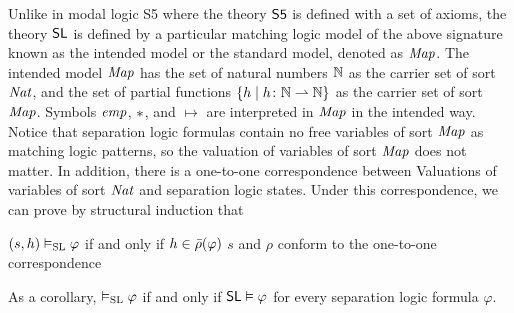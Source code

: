 \documentclass{amsart}
\begin{document}
Unlike in modal logic S5 where the theory $\MLSfive$ is defined with a set of
axioms,
the theory $\MLSL$ is defined by 
a particular matching logic model 
of the above signature
known as the intended model or the standard model, denoted as $\Map$.
The intended model $\Map$ has the set of natural numbers $\nats$ as the carrier
set of sort $\Nat$,
and the set of partial functions 
$ \{ h \mid h \colon \nats \pto \nats \} $
as the carrier set of sort $\Map$.
Symbols $\emp$, $\merge$, and $\mapsto$ are interpreted in $\Map$ in the
intended way.
Notice that separation logic formulas contain no free variables of sort $\Map$
as matching logic patterns,
so the valuation of variables of sort $\Map$ does not matter.
In addition, there is a one-to-one correspondence between 
Valuations of variables of sort $\Nat$ and separation logic states.
Under this correspondence, we can prove by structural induction that
\begin{center}
$(s,h) \vDash_\SL \varphi$
 if and only if 
$h \in \rhobar(\varphi)$
\quad \doubleslash $s$ and $\rho$ conform to the one-to-one correspondence
\end{center}
As a corollary,
$\vDash_\SL \varphi$ if and only if
$\MLSL \vDash \varphi$ for every separation logic formula $\varphi$.
\end{document}
